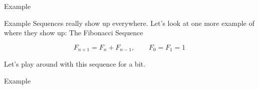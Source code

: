 \documentclass[presentation]{beamer}
\begin{document}
\begin{frame}[label={sec:org9cb8091}]{Example}
\end{frame}

\begin{frame}[label={sec:org2b850b9}]{Example}
Sequences really show up everywhere.  Let's look at one more example of where they show up: The Fibonacci Sequence

\[
F_{n+1} = F_n + F_{n-1},\qquad F_0 = F_1 = 1\]

Let's play around with this sequence for a bit.

\vspace{10in}
\end{frame}

\begin{frame}[label={sec:orgecd89f8}]{Example}
\end{frame}
\end{document}
